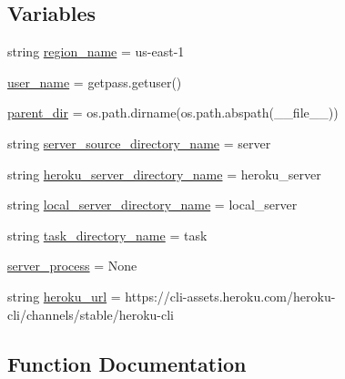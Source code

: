 \subsection*{Variables}
\begin{DoxyCompactItemize}
\item 
string \hyperlink{namespaceparlai_1_1messenger_1_1core_1_1server__utils_a0141ad67f4ed6b9f9e191c1abd62d22c}{region\+\_\+name} = \textquotesingle{}us-\/east-\/1\textquotesingle{}
\item 
\hyperlink{namespaceparlai_1_1messenger_1_1core_1_1server__utils_a42bc15986abd6792e94812568f545e06}{user\+\_\+name} = getpass.\+getuser()
\item 
\hyperlink{namespaceparlai_1_1messenger_1_1core_1_1server__utils_a045bfeca7b0cc10551c83eb5e4618524}{parent\+\_\+dir} = os.\+path.\+dirname(os.\+path.\+abspath(\+\_\+\+\_\+file\+\_\+\+\_\+))
\item 
string \hyperlink{namespaceparlai_1_1messenger_1_1core_1_1server__utils_a009ee576064d60761424a5c472f081a4}{server\+\_\+source\+\_\+directory\+\_\+name} = \textquotesingle{}server\textquotesingle{}
\item 
string \hyperlink{namespaceparlai_1_1messenger_1_1core_1_1server__utils_a29a8a8e11fb4ed5bb4db081009ede6aa}{heroku\+\_\+server\+\_\+directory\+\_\+name} = \textquotesingle{}heroku\+\_\+server\textquotesingle{}
\item 
string \hyperlink{namespaceparlai_1_1messenger_1_1core_1_1server__utils_a84b23bb1b0184a0b36f98c6a29699fc8}{local\+\_\+server\+\_\+directory\+\_\+name} = \textquotesingle{}local\+\_\+server\textquotesingle{}
\item 
string \hyperlink{namespaceparlai_1_1messenger_1_1core_1_1server__utils_aa0250aef1e93e928eb577c3303c70fd6}{task\+\_\+directory\+\_\+name} = \textquotesingle{}task\textquotesingle{}
\item 
\hyperlink{namespaceparlai_1_1messenger_1_1core_1_1server__utils_a7e49ed248488f38290c6029824739cd0}{server\+\_\+process} = None
\item 
string \hyperlink{namespaceparlai_1_1messenger_1_1core_1_1server__utils_acbdcfdd8a06254191437907df0e90659}{heroku\+\_\+url} = \textquotesingle{}https\+://cli-\/assets.\+heroku.\+com/heroku-\/cli/channels/stable/heroku-\/cli\textquotesingle{}
\end{DoxyCompactItemize}


\subsection{Function Documentation}
\mbox{\label{namespaceparlai_1_1messenger_1_1core_1_1server__utils_a94b0647ae0e38dcada7dd0c4501dd179}} 
